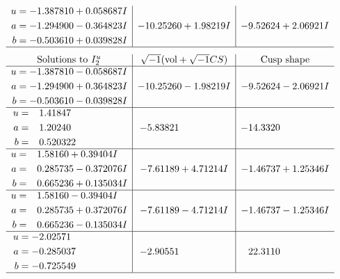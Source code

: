\documentclass[1p]{elsarticle_modified}
\theoremstyle{definition}
\newcommand{\I}{\sqrt{-1}}
\begin{document}
$$\begin{array}{c|c|c}
\begin{aligned}
u &= -1.387810 + 0.058687 I \\
a &= -1.294900 - 0.364823 I \\
b &= -0.503610 + 0.039828 I\end{aligned}
 & -10.25260 + 1.98219 I & -9.52624 + 2.06921 I\\
 \hline 
 \end{array}$$\newpage$$\begin{array}{c|c|c}  
\text{Solutions to }I^u_{2}& \I (\text{vol} + \sqrt{-1}CS) & \text{Cusp shape}\\
 \hline 
\begin{aligned}
u &= -1.387810 - 0.058687 I \\
a &= -1.294900 + 0.364823 I \\
b &= -0.503610 - 0.039828 I\end{aligned}
 & -10.25260 - 1.98219 I & -9.52624 - 2.06921 I \\ \hline\begin{aligned}
u &= \phantom{-}1.41847\phantom{ +0.000000I} \\
a &= \phantom{-}1.20240\phantom{ +0.000000I} \\
b &= \phantom{-}0.520322\phantom{ +0.000000I}\end{aligned}
 & -5.83821\phantom{ +0.000000I} & -14.3320\phantom{ +0.000000I} \\ \hline\begin{aligned}
u &= \phantom{-}1.58160 + 0.39404 I \\
a &= \phantom{-}0.285735 - 0.372076 I \\
b &= \phantom{-}0.665236 + 0.135034 I\end{aligned}
 & -7.61189 + 4.71214 I & -1.46737 + 1.25346 I \\ \hline\begin{aligned}
u &= \phantom{-}1.58160 - 0.39404 I \\
a &= \phantom{-}0.285735 + 0.372076 I \\
b &= \phantom{-}0.665236 - 0.135034 I\end{aligned}
 & -7.61189 - 4.71214 I & -1.46737 - 1.25346 I \\ \hline\begin{aligned}
u &= -2.02571\phantom{ +0.000000I} \\
a &= -0.285037\phantom{ +0.000000I} \\
b &= -0.725549\phantom{ +0.000000I}\end{aligned}
 & -2.90551\phantom{ +0.000000I} & \phantom{-}22.3110\phantom{ +0.000000I}\\
 \hline 
 \end{array}$$\newpage
\end{document}
